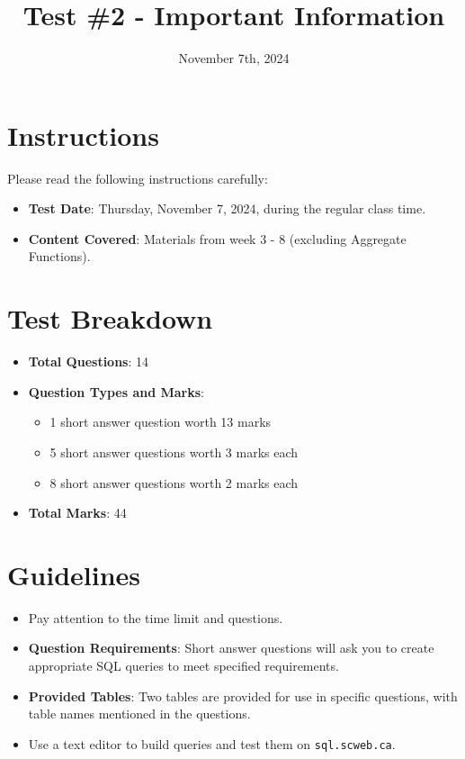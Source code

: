 \documentclass{article}
\begin{document}
\title{Test \#2 - Important Information}
\author{}
\date{November 7th, 2024}
\maketitle

\section*{Instructions}
Please read the following instructions carefully:

\begin{itemize}
    \item \textbf{Test Date}: Thursday, November 7, 2024, during the regular class time.
    \item \textbf{Content Covered}: Materials from week 3 - 8 (excluding Aggregate Functions).
\end{itemize}

\section*{Test Breakdown}
\begin{itemize}
    \item \textbf{Total Questions}: 14
    \item \textbf{Question Types and Marks}:
    \begin{itemize}
        \item 1 short answer question worth 13 marks
        \item 5 short answer questions worth 3 marks each
        \item 8 short answer questions worth 2 marks each
    \end{itemize}
    \item \textbf{Total Marks}: 44
\end{itemize}

\section*{Guidelines}
\begin{itemize}
    \item Pay attention to the time limit and questions.
    \item \textbf{Question Requirements}: Short answer questions will ask you to create appropriate SQL queries to meet specified requirements.
    \item \textbf{Provided Tables}: Two tables are provided for use in specific questions, with table names mentioned in the questions.
    \item Use a text editor to build queries and test them on \texttt{sql.scweb.ca}.
\end{itemize}
\end{document}
